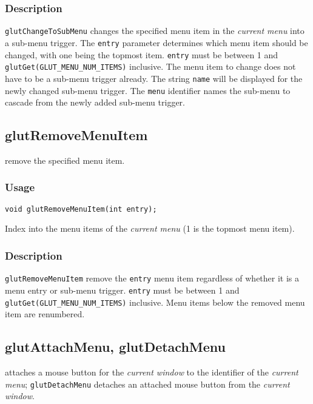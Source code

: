 \subsubsection*{Description}

{\tt glutChangeToSubMenu} changes the specified menu item in the {\em
current menu} into a sub-menu trigger.  The {\tt entry} parameter
determines which menu item should be changed, with one being the
topmost item.  
{\tt entry} must be between 1 and {\tt glutGet(GLUT\_MENU\_NUM\_ITEMS)}
inclusive.
The menu item to change does not have to be a sub-menu
trigger already.  The string {\tt name}
will be displayed for the newly changed sub-menu trigger.
The {\tt menu} identifier names the sub-menu to cascade from the
newly added sub-menu trigger.

\subsection{glutRemoveMenuItem}

 remove the specified menu item.

\subsubsection*{Usage}
\begin{verbatim}
void glutRemoveMenuItem(int entry);
\end{verbatim}
\begin{description}
\itemsep 0in
\item[{\tt entry}]
Index into the menu items of the {\em current menu} (1 is the topmost
menu item).
\end{description}

\subsubsection*{Description}

{\tt glutRemoveMenuItem} remove the {\tt entry} menu item regardless of whether it
is a menu entry or sub-menu trigger.
{\tt entry} must be between 1 and {\tt glutGet(GLUT\_MENU\_NUM\_ITEMS)}
inclusive.
Menu items below the removed menu item are renumbered.

\subsection{glutAttachMenu, glutDetachMenu}

 attaches a mouse button for the {\em current window} to the identifier of
the {\em current menu}; {\tt glutDetachMenu} detaches an attached mouse button from the
{\em current window}.

